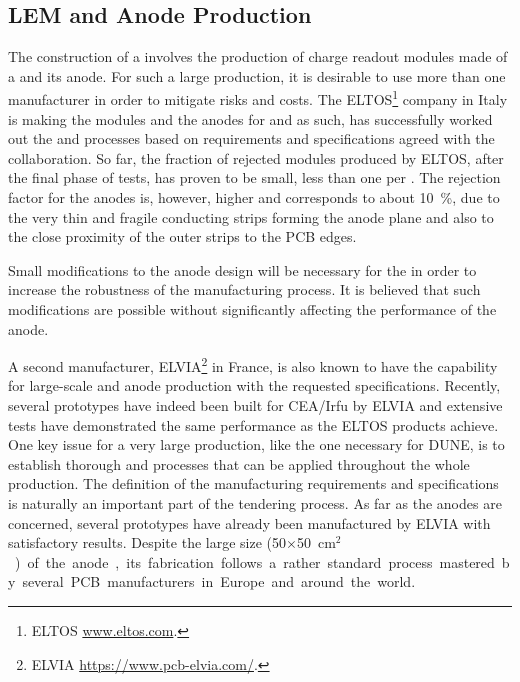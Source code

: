 \subsection{LEM and Anode Production}
\label{sec:dp-crp-LASprod}


The construction of a  
 involves the production of \dpnumswch charge readout modules made of a  and its anode. For such a large production, it is desirable to use more than one manufacturer in order to mitigate risks and costs. The ELTOS\footnote{ ELTOS\texttrademark{} \url{www.eltos.com}.} company in Italy is making the  modules and the anodes for   and as such, has successfully worked out the  and  processes based on requirements and specifications agreed with the  collaboration. So far, the fraction of rejected  modules produced by ELTOS, after the final phase of tests, has proven to be small, less than one  per . The rejection factor for the anodes is, however, higher and corresponds to about \SI{10}{\%}, due to the very thin and fragile conducting strips forming the anode plane and also to the close proximity of the outer strips to the PCB edges. 

Small modifications to the anode design will be necessary for the  in order to increase the robustness of the manufacturing process. It is believed that such modifications are possible without  %
significantly affecting the performance of the anode.   

A second manufacturer, ELVIA\footnote{ELVIA\texttrademark{} \url{https://www.pcb-elvia.com/}.} in France, is also known to have the capability for large-scale  and anode production with the requested specifications. Recently, several  prototypes have indeed been built for CEA/Irfu 
by ELVIA and extensive tests have %
demonstrated the same   performance as the ELTOS products achieve.
 One key issue for a very large production, like the one necessary for DUNE, is to establish thorough  and  processes that can be applied throughout the whole  production. The definition of the  manufacturing requirements and specifications is naturally an important part of the tendering process. As far as the anodes are concerned, several prototypes have already been manufactured by ELVIA with satisfactory results. Despite the large size (\num{50}$\times$\SI{50}{cm$^2$}) of the anode, its fabrication follows a rather standard process mastered by several PCB manufacturers in Europe and around the world.     

